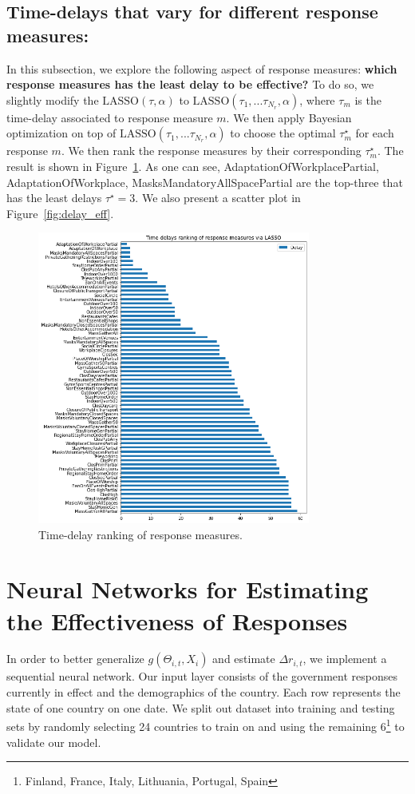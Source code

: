 \documentclass[11pt]{article}
\begin{document}
\subsection*{Time-delays that vary for different response measures:} In this subsection, we explore the following aspect of response measures: \textbf{which response measures has the least delay to be effective?} To do so, we slightly modify the $\text{LASSO}(\tau, \alpha)$ to $\text{LASSO}(\tau_1,...\tau_{N_r}, \alpha)$, where $\tau_m$ is the time-delay associated to response measure $m$. We then apply Bayesian optimization on top of $\text{LASSO}(\tau_1,...\tau_{N_r}, \alpha)$ to choose the optimal $\tau^\star_m$ for each response $m$. We then rank the response measures by their corresponding $\tau^\star_m$. The result is shown in Figure~\ref{fig:delay_lasso}. As one can see, AdaptationOfWorkplacePartial, AdaptationOfWorkplace, MasksMandatoryAllSpacePartial are the top-three that has the least delays $\tau^\star = 3$. We also present a scatter plot in Figure~\ref{fig:delay_eff}. 
\begin{figure}[!hbt]
\centering
\includegraphics[width=0.8\textwidth]{delay_lasso.png}
         \caption{Time-delay ranking of response measures.}
         \label{fig:delay_lasso}
\end{figure}

\section{Neural Networks for Estimating the Effectiveness of Responses}
In order to better generalize $g(\Theta_{i,t},X_i)$ and estimate $\Delta r_{i,t}$, we implement a sequential neural network. Our input layer consists of the government responses currently in effect and the demographics of the country. Each row represents the state of one country on one date. We split out dataset into training and testing sets by randomly selecting 24 countries to train on and using the remaining 6\footnote{Finland, France, Italy, Lithuania, Portugal, Spain} to validate our model.
\end{document}
